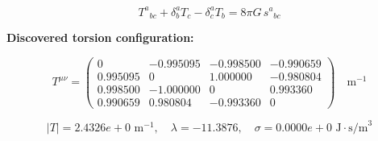 
\begin{equation}
  T^a{}_{bc} + \delta^a_b T_c - \delta^a_c T_b = 8\pi G \, s^a{}_{bc}
\end{equation}

\textbf{Discovered torsion configuration:}

\begin{equation}
  T^{\mu\nu} = \begin{pmatrix}
    0 & -0.995095 & -0.998500 & -0.990659 \\
    0.995095 & 0 & 1.000000 & -0.980804 \\
    0.998500 & -1.000000 & 0 & 0.993360 \\
    0.990659 & 0.980804 & -0.993360 & 0
  \end{pmatrix} \quad \text{m}^{-1}
\end{equation}

\begin{equation}
  |T| = 2.4326e+0 \text{ m}^{-1}, \quad
  \lambda = -11.3876, \quad
  \sigma = 0.0000e+0 \text{ J}\cdot\text{s/m}^3
\end{equation}